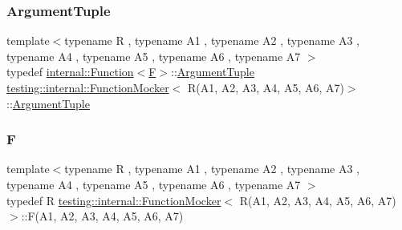 \subsubsection{\texorpdfstring{Argument\+Tuple}{ArgumentTuple}}
{\footnotesize\ttfamily template$<$typename R , typename A1 , typename A2 , typename A3 , typename A4 , typename A5 , typename A6 , typename A7 $>$ \\
typedef \hyperlink{structtesting_1_1internal_1_1_function}{internal\+::\+Function}$<$\hyperlink{classtesting_1_1internal_1_1_function_mocker_3_01_r_07_a1_00_01_a2_00_01_a3_00_01_a4_00_01_a5_00_01_a6_00_01_a7_08_4_a2ea0e33d9cc0d1f57d58b4aee98c117c}{F}$>$\+::\hyperlink{classtesting_1_1internal_1_1_function_mocker_3_01_r_07_a1_00_01_a2_00_01_a3_00_01_a4_00_01_a5_00_01_a6_00_01_a7_08_4_a313911b9c80b57c8c25f0ad5ef2d0bdc}{Argument\+Tuple} \hyperlink{classtesting_1_1internal_1_1_function_mocker}{testing\+::internal\+::\+Function\+Mocker}$<$ R(A1, A2, A3, A4, A5, A6, A7)$>$\+::\hyperlink{classtesting_1_1internal_1_1_function_mocker_3_01_r_07_a1_00_01_a2_00_01_a3_00_01_a4_00_01_a5_00_01_a6_00_01_a7_08_4_a313911b9c80b57c8c25f0ad5ef2d0bdc}{Argument\+Tuple}}

\mbox{\label{classtesting_1_1internal_1_1_function_mocker_3_01_r_07_a1_00_01_a2_00_01_a3_00_01_a4_00_01_a5_00_01_a6_00_01_a7_08_4_a2ea0e33d9cc0d1f57d58b4aee98c117c}} 
\subsubsection{\texorpdfstring{F}{F}}
{\footnotesize\ttfamily template$<$typename R , typename A1 , typename A2 , typename A3 , typename A4 , typename A5 , typename A6 , typename A7 $>$ \\
typedef R \hyperlink{classtesting_1_1internal_1_1_function_mocker}{testing\+::internal\+::\+Function\+Mocker}$<$ R(A1, A2, A3, A4, A5, A6, A7)$>$\+::F(A1, A2, A3, A4, A5, A6, A7)}




